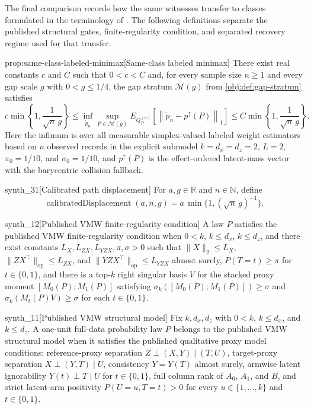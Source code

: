 \documentclass[11pt]{article}
\begin{document}
The final comparison records how the same witnesses transfer to classes formulated in the terminology of \citet{VirkMazaheriWu2026}. The following definitions separate the published structural gates, finite-regularity condition, and separated recovery regime used for that transfer.

\begin{propositionv}{prop:same-class-labeled-minimax}[Same-class labeled minimax]
There exist real constants \(c\) and \(C\) such that \(0<c<C\) and, for every sample size \(n\ge 1\) and every gap scale \(g\) with \(0<g\le 1/4\), the gap stratum \(\mathcal M(g)\) from \cref{obj:def:gap-stratum} satisfies
\[
c\min\left\{1,\frac{1}{\sqrt n\,g}\right\}
\le
\inf_{\widetilde p_n}
\sup_{P\in\mathcal M(g)}
E_{Q_P^{(n)}}\!\left[
\left\|\widetilde p_n-p^{\uparrow}(P)\right\|_1
\right]
\le
C\min\left\{1,\frac{1}{\sqrt n\,g}\right\}.
\]
Here the infimum is over all measurable simplex-valued labeled weight estimators based on \(n\) observed records in the explicit submodel \(k=d_x=d_z=2\), \(L=2\), \(\pi_0=1/10\), and \(\sigma_0=1/10\), and \(p^{\uparrow}(P)\) is the effect-ordered latent-mass vector with the barycentric collision fallback.
\end{propositionv}

\begin{definitionv}{synth_31}[Calibrated path displacement]
For \(a,g\in\mathbb R\) and \(n\in\mathbb N\), define
\[
\operatorname{calibratedDisplacement}(a,n,g)
=
a\,\min\{1,(\sqrt n\,g)^{-1}\}.
\]
\end{definitionv}

\begin{definitionv}{synth_12}[Published VMW finite-regularity condition]
A law \(P\) satisfies the published VMW finite-regularity condition when \(0<k\), \(k\le d_x\), \(k\le d_z\), and there exist constants \(L_X,L_{ZX},L_{YZX},\pi,\sigma>0\) such that \(\lVert X\rVert_2\le L_X\), \(\lVert ZX^\top\rVert_{\mathrm{op}}\le L_{ZX}\), and \(\lVert YZX^\top\rVert_{\mathrm{op}}\le L_{YZX}\) almost surely, \(P(T=t)\ge\pi\) for \(t\in\{0,1\}\), and there is a top-\(k\) right singular basis \(V\) for the stacked proxy moment \([M_0(P);M_1(P)]\) satisfying \(\sigma_k([M_0(P);M_1(P)])\ge\sigma\) and \(\sigma_k(M_t(P)V)\ge\sigma\) for each \(t\in\{0,1\}\).
\end{definitionv}

\begin{definitionv}{synth_11}[Published VMW structural model]
Fix \(k,d_x,d_z\) with \(0<k\), \(k\le d_x\), and \(k\le d_z\). A one-unit full-data probability law \(P\) belongs to the published VMW structural model when it satisfies the published qualitative proxy model conditions: reference-proxy separation \(Z\perp (X,Y)\mid(T,U)\), target-proxy separation \(X\perp (Y,T)\mid U\), consistency \(Y=Y(T)\) almost surely, armwise latent ignorability \(Y(t)\perp T\mid U\) for \(t\in\{0,1\}\), full column rank of \(A_0\), \(A_1\), and \(B\), and strict latent-arm positivity \(P(U=u,T=t)>0\) for every \(u\in\{1,\ldots,k\}\) and \(t\in\{0,1\}\).
\end{definitionv}
\end{document}
